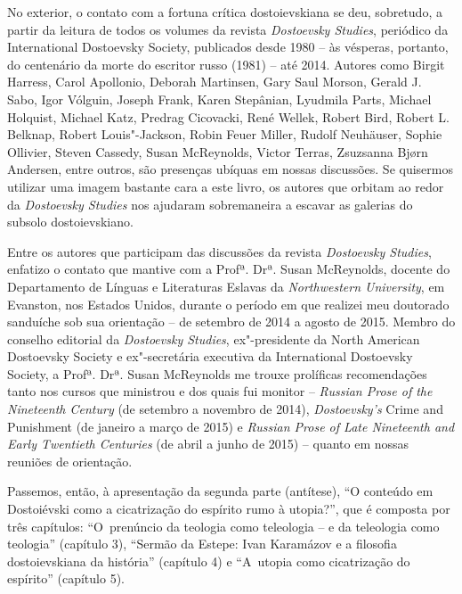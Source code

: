 {No exterior, o contato com a fortuna crítica dostoievskiana se deu,
sobretudo, a partir da leitura de todos os volumes da revista
\emph{Dostoevsky Studies}, periódico da International Dostoevsky
Society, publicados desde 1980 -- às vésperas, portanto, do centenário
da morte do escritor russo (1981) -- até 2014. Autores como Birgit
Harress, Carol Apollonio, Deborah Martinsen, Gary Saul Morson, Gerald J.
Sabo, Igor Vólguin, Joseph Frank, Karen Stepânian, Lyudmila Parts,
Michael Holquist, Michael Katz, Predrag Cicovacki, René Wellek, Robert
Bird, Robert L. Belknap, Robert Louis"-Jackson, Robin Feuer Miller,
Rudolf Neuhäuser, Sophie Ollivier, Steven Cassedy, Susan McReynolds,
Victor Terras, Zsuzsanna Bjørn Andersen, entre outros, são presenças
ubíquas em nossas discussões. Se quisermos utilizar uma imagem bastante
cara a este livro, os autores que orbitam ao redor da \emph{Dostoevsky
Studies} nos ajudaram sobremaneira a escavar as galerias do subsolo
dostoievskiano.

Entre os autores que participam das discussões da revista
\emph{Dostoevsky Studies}, enfatizo o contato que mantive com a Profª.
Drª. Susan McReynolds, docente do Departamento de Línguas e Literaturas
Eslavas da \emph{Northwestern University}, em Evanston, nos Estados
Unidos, durante o período em que realizei meu doutorado sanduíche sob
sua orientação -- de setembro de 2014 a agosto de 2015. Membro do
conselho editorial da \emph{Dostoevsky Studies}, ex"-presidente da North
American Dostoevsky Society e ex"-secretária executiva da International
Dostoevsky Society, a Profª. Drª. Susan McReynolds me trouxe prolíficas
recomendações tanto nos cursos que ministrou e dos quais fui monitor --
\emph{Russian Prose of the Nineteenth Century} (de setembro a novembro
de 2014), \emph{Dostoevsky's} Crime and Punishment (de janeiro a março
de 2015) e \emph{Russian Prose of Late Nineteenth and Early Twentieth
Centuries} (de abril a junho de 2015) -- quanto em nossas reuniões de
orientação.

Passemos, então, à apresentação da segunda parte (antítese), ``O
conteúdo em Dostoiévski como a cicatrização do espírito rumo à
utopia?'', que é composta por três capítulos: ``O~prenúncio da teologia
como teleologia -- e da teleologia como teologia'' (capítulo 3),
``Sermão da Estepe: Ivan Karamázov e a filosofia dostoievskiana da
história'' (capítulo 4) e ``A~utopia como cicatrização do espírito''
(capítulo 5).

}
